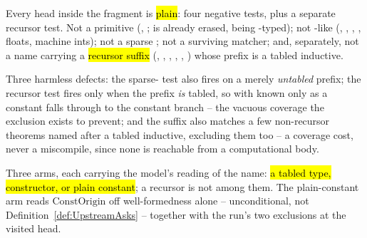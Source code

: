 \begin{definition}
\label{def:PlainHead}
\leanok
{}
 Every head inside the fragment is \hl{plain}: four negative tests, plus a separate
recursor test.
Not a  primitive (, ;  is already
erased, being -typed); not -like (, , ,
, floats, machine ints); not a sparse ; not a surviving matcher; and,
separately, not a name carrying a \hl{recursor suffix} (, , ,
, , ) whose prefix is a tabled inductive.
\end{definition}

\begin{remark}
 Three harmless defects: the sparse- test also fires on a merely
\emph{untabled} prefix; the recursor test fires only when the prefix \emph{is} tabled, so
 with  known only as a constant falls through to the constant branch --
the vacuous coverage the exclusion exists to prevent; and the  suffix also matches a
few non-recursor theorems named after a tabled inductive, excluding them too -- a coverage cost,
never a miscompile, since none is reachable from a computational body.
\end{remark}

\begin{definition}
\label{def:KnownHead}
\leanok
{}
 Three arms, each carrying the model's reading of the name: \hl{a tabled type,
constructor, or plain constant}; a recursor is not among them.
 The plain-constant arm reads $\mathrm{ConstOrigin}$ off well-formedness alone --
unconditional, not Definition~\ref{def:UpstreamAsks} -- together with the run's two exclusions at
the visited head.
\end{definition}

